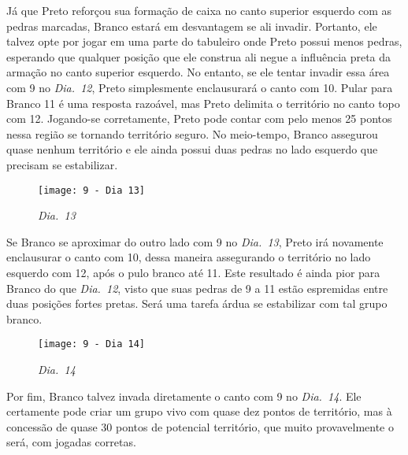 \bigskip

Já que Preto reforçou sua formação de caixa no canto superior esquerdo com as pedras marcadas, Branco estará em desvantagem se ali invadir. Portanto, ele talvez opte por jogar em uma parte do tabuleiro onde Preto possui menos pedras, esperando que qualquer posição que ele construa ali negue a influência preta da armação no canto superior esquerdo. No entanto, se ele tentar invadir essa área com 9 no \emph{Dia.\@~12}, Preto simplesmente enclausurará o canto com 10. Pular para Branco 11 é uma resposta razoável, mas Preto delimita o território no canto topo com 12. Jogando-se corretamente, Preto pode contar com pelo menos 25 pontos nessa região se tornando território seguro. No meio-tempo, Branco assegurou quase nenhum território e ele ainda possui duas pedras no lado esquerdo que precisam se estabilizar.

\begin{wrapfigure}{r}{60mm}
    \vspace{-27.5pt}
    \begin{center}
        \texttt{[image: 9 - Dia 13]}
        \captionsetup{justification=centering}
        \caption*{\emph{Dia.\@~13}}
    \end{center}
    \vspace{-10pt}
\end{wrapfigure}

Se Branco se aproximar do outro lado com 9 no \emph{Dia.\@~13}, Preto irá novamente enclausurar o canto com 10, dessa maneira assegurando o território no lado esquerdo com 12, após o pulo branco até 11. Este resultado é ainda pior para Branco do que \emph{Dia.\@~12}, visto que suas pedras de 9 a 11 estão espremidas  entre duas posições fortes pretas. Será uma tarefa árdua se estabilizar com tal grupo branco.

\begin{wrapfigure}{l}{60mm}
    \vspace{-25pt}
    \begin{center}
        \texttt{[image: 9 - Dia 14]}
        \captionsetup{justification=centering}
        \caption*{\emph{Dia.\@~14}}
    \end{center}
    \vspace{-25pt}
\end{wrapfigure}

Por fim, Branco talvez invada diretamente o canto com 9 no \emph{Dia.\@~14}. Ele certamente pode criar um grupo vivo com quase dez pontos de território, mas à concessão de quase 30 pontos de potencial território, que muito provavelmente o será, com jogadas corretas.

